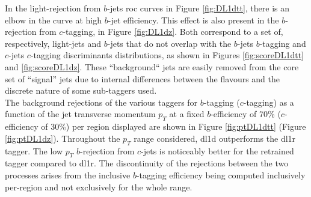 In the light-rejection from $b$-jets \gls{roc} curves in Figure \ref{fig:DL1dtt}, there is an elbow in the curve at high $b$-jet efficiency. This effect is also present in the $b$-rejection from $c$-tagging, in Figure \ref{fig:DL1dz}. Both correspond to a set of, respectively, light-jets and $b$-jets that do not overlap with the $b$-jets $b$-tagging and $c$-jets $c$-tagging discriminants distributions, as shown in Figures \ref{fig:scoreDL1dtt} and \ref{fig:scoreDL1dz}. These ``background`` jets are easily removed from the core set of ``signal'' jets due to internal differences between the flavours and the discrete nature of some sub-taggers used. \\

The background rejections of the various taggers for $b$-tagging ($c$-tagging) as a function of the jet transverse momentum $p_T$ at a fixed $b$-efficiency of 70\% ($c$-efficiency of 30\%) per region displayed are shown in Figure \ref{fig:ptDL1dtt} (Figure \ref{fig:ptDL1dz}). Throughout the $p_T$ range considered, \gls{dl1d} outperforms the \gls{dl1r} tagger. The low $p_T$ $b$-rejection from $c$-jets is noticeably better for the retrained tagger compared to \gls{dl1r}. The discontinuity of the rejections between the two processes arises from the inclusive $b$-tagging efficiency being computed inclusively per-region and not exclusively for the whole range. 

